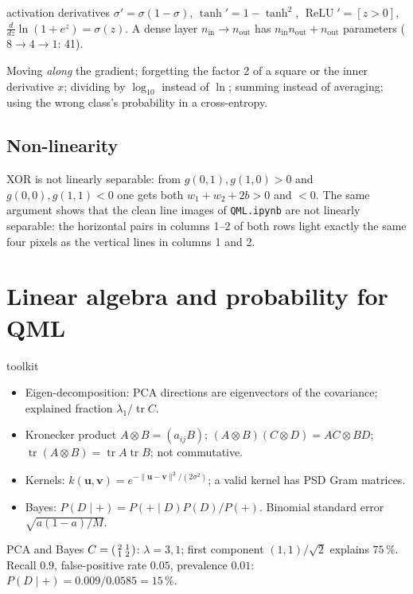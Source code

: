 \documentclass[11pt,a4paper,openany]{book}
\newcounter{wex}[chapter]
\begin{document}
\begin{keyres}{activation derivatives}
$\sigma' = \sigma(1 - \sigma)$, $\tanh' = 1 - \tanh^2$, $\operatorname{ReLU}' = [z > 0]$, $\frac{d}{dz}\ln(1 + e^z) = \sigma(z)$.
A dense layer $n_{\text{in}} \to n_{\text{out}}$ has $n_{\text{in}}n_{\text{out}} + n_{\text{out}}$ parameters ($8 \to 4 \to 1$: 41).
\end{keyres}

\begin{trap}
Moving \emph{along} the gradient; forgetting the factor 2 of a square or the inner derivative $x$; dividing by $\log_{10}$ instead of $\ln$;
summing instead of averaging; using the wrong class's probability in a cross-entropy.
\end{trap}

\subsection{Non-linearity}
XOR is not linearly separable: from $g(0,1), g(1,0) > 0$ and $g(0,0), g(1,1) < 0$ one gets both $w_1 + w_2 + 2b > 0$ and $< 0$.
The same argument shows that the clean line images of \texttt{QML.ipynb} are not linearly separable: the horizontal pairs in
columns 1--2 of both rows light exactly the same four pixels as the vertical lines in columns 1 and 2.

\section{Linear algebra and probability for QML}
\begin{keyres}{toolkit}
\begin{itemize}[leftmargin=1.2em, itemsep=1pt]
\item Eigen-decomposition: PCA directions are eigenvectors of the covariance; explained fraction $\lambda_1/\operatorname{tr}C$.
\item Kronecker product $A\otimes B = (a_{ij}B)$; $(A\otimes B)(C\otimes D) = AC\otimes BD$; $\operatorname{tr}(A\otimes B) = \operatorname{tr}A\operatorname{tr}B$; not commutative.
\item Kernels: $k(\mathbf u, \mathbf v) = e^{-\|\mathbf u - \mathbf v\|^2/(2\sigma^2)}$; a valid kernel has PSD Gram matrices.
\item Bayes: $P(D\mid +) = P(+\mid D)P(D)/P(+)$. Binomial standard error $\sqrt{a(1 - a)/M}$.
\end{itemize}
\end{keyres}
\begin{wexample}{PCA and Bayes}
$C = \begin{psmallmatrix}2&1\\1&2\end{psmallmatrix}$: $\lambda = 3, 1$; first component $(1,1)/\sqrt2$ explains $75\,\%$.
Recall $0.9$, false-positive rate $0.05$, prevalence $0.01$: $P(D\mid+) = 0.009/0.0585 = 15\,\%$.
\end{wexample}
\end{document}
